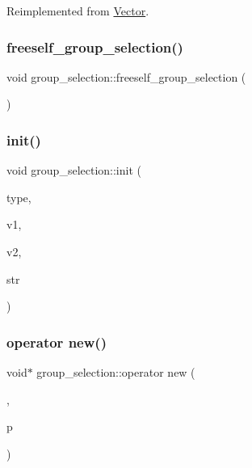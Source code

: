 Reimplemented from \mbox{\hyperlink{class_vector_af657307f3d344c8cef5d633335a5f484}{Vector}}.

\mbox{\label{classgroup__selection_a778b1a466858bf7f90516eeba1795798}} 
\subsubsection{\texorpdfstring{freeself\+\_\+group\+\_\+selection()}{freeself\_group\_selection()}}
{\footnotesize\ttfamily void group\+\_\+selection\+::freeself\+\_\+group\+\_\+selection (\begin{DoxyParamCaption}{ }\end{DoxyParamCaption})}

\mbox{\label{classgroup__selection_ad12ab2226024716902e4a85c4772732b}} 
\subsubsection{\texorpdfstring{init()}{init()}}
{\footnotesize\ttfamily void group\+\_\+selection\+::init (\begin{DoxyParamCaption}\item[{\mbox{\hyperlink{discreta_8h_a9fbd019a849defc14910ae0a667c516e}{group\+\_\+selection\+\_\+type}}}]{type,  }\item[{\mbox{\hyperlink{galois_8h_a09fddde158a3a20bd2dcadb609de11dc}{I\+NT}}}]{v1,  }\item[{\mbox{\hyperlink{galois_8h_a09fddde158a3a20bd2dcadb609de11dc}{I\+NT}}}]{v2,  }\item[{\mbox{\hyperlink{galois_8h_ab6cc7b4aeb6ea31aba2b3fbfc83ff5e6}{B\+Y\+TE}} $\ast$}]{str }\end{DoxyParamCaption})}

\mbox{\label{classgroup__selection_af99b3b7ee09ea8e09f7be9cf080c74d3}} 
\subsubsection{\texorpdfstring{operator new()}{operator new()}}
{\footnotesize\ttfamily void$\ast$ group\+\_\+selection\+::operator new (\begin{DoxyParamCaption}\item[{size\+\_\+t}]{,  }\item[{void $\ast$}]{p }\end{DoxyParamCaption})\hspace{0.3cm}{\ttfamily [inline]}}

